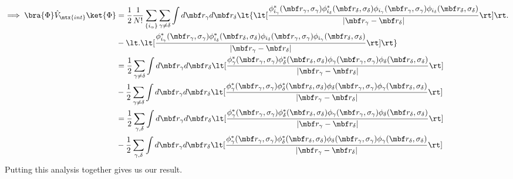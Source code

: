\documentclass[10pt]{article}
\begin{document}
  \begin{align*}
    \implies
    \bra{\Phi} \hat V_\mtx{int} \ket{\Phi}
    &=
    \frac12 
    \frac{1}{N!} \sum_{\{i_\alpha\}}
    \sum_{\gamma \ne \delta}
    \int d\mbf r_\gamma d\mbf r_\delta
    \lt\{
      \lt[
      \frac 
      {
        \phi_{i_\gamma}^*(\mbf r_\gamma, \sigma_\gamma)
        \phi_{i_\delta}^*(\mbf r_\delta, \sigma_\delta)
        \phi_{i_\gamma}(\mbf r_\gamma, \sigma_\gamma)
        \phi_{i_\delta}(\mbf r_\delta, \sigma_\delta)
      }
      {|\mbf r_\gamma - \mbf r_\delta|} \rt]
    \rt.
      \\
      &-
    \lt.
      \lt[
      \frac 
      {
        \phi_{i_\gamma}^*(\mbf r_\gamma, \sigma_\gamma)
        \phi_{i_\delta}^*(\mbf r_\delta, \sigma_\delta)
        \phi_{i_\delta}(\mbf r_\gamma, \sigma_\gamma)
        \phi_{i_\gamma}(\mbf r_\delta, \sigma_\delta)
      }
      {|\mbf r_\gamma - \mbf r_\delta|} \rt]
    \rt\}
    \\
    &=
    \frac12 
    \sum_{\gamma \ne \delta}
    \int d\mbf r_\gamma d\mbf r_\delta
    \lt[
    \frac 
    {
      \phi_{\gamma}^*(\mbf r_\gamma, \sigma_\gamma)
      \phi_{\delta}^*(\mbf r_\delta, \sigma_\delta)
      \phi_{\gamma}(\mbf r_\gamma, \sigma_\gamma)
      \phi_{\delta}(\mbf r_\delta, \sigma_\delta)
    }
    {|\mbf r_\gamma - \mbf r_\delta|} \rt]
      \\
      &-
    \frac12 
    \sum_{\gamma \ne \delta}
    \int d\mbf r_\gamma d\mbf r_\delta
    \lt[
    \frac 
    {
      \phi_{\gamma}^*(\mbf r_\gamma, \sigma_\gamma)
      \phi_{\delta}^*(\mbf r_\delta, \sigma_\delta)
      \phi_{\delta}(\mbf r_\gamma, \sigma_\gamma)
      \phi_{\gamma}(\mbf r_\delta, \sigma_\delta)
    }
    {|\mbf r_\gamma - \mbf r_\delta|} \rt]
    \\
    &=
    \frac12 
    \sum_{\gamma, \delta}
    \int d\mbf r_\gamma d\mbf r_\delta
    \lt[
    \frac 
    {
      \phi_{\gamma}^*(\mbf r_\gamma, \sigma_\gamma)
      \phi_{\delta}^*(\mbf r_\delta, \sigma_\delta)
      \phi_{\gamma}(\mbf r_\gamma, \sigma_\gamma)
      \phi_{\delta}(\mbf r_\delta, \sigma_\delta)
    }
    {|\mbf r_\gamma - \mbf r_\delta|} \rt]
      \\
      &-
    \frac12 
    \sum_{\gamma, \delta}
    \int d\mbf r_\gamma d\mbf r_\delta
    \lt[
    \frac 
    {
      \phi_{\gamma}^*(\mbf r_\gamma, \sigma_\gamma)
      \phi_{\delta}^*(\mbf r_\delta, \sigma_\delta)
      \phi_{\delta}(\mbf r_\gamma, \sigma_\gamma)
      \phi_{\gamma}(\mbf r_\delta, \sigma_\delta)
    }
    {|\mbf r_\gamma - \mbf r_\delta|} \rt]
  \end{align*}
  Putting this analysis together gives us our result.
\end{document}
